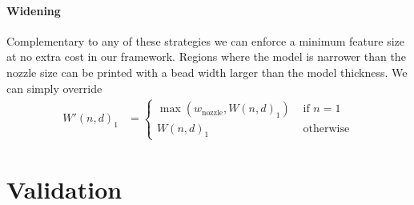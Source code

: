 \paragraph{Widening}
Complementary to any of these strategies we can enforce a minimum feature size at no extra cost in our framework.
Regions where the model is narrower than the nozzle size can be printed with a bead width larger than the model thickness.
We can simply override
\begin{align*}
W'(n,d)_1 &=
\begin{cases}
\max \left( w_\text{nozzle}  ,  W(n,d)_1 \right) & \text{ if } n = 1 \\
W(n,d)_1 & \text{ otherwise}
\end{cases}
\end{align*}




















\section{Validation}

